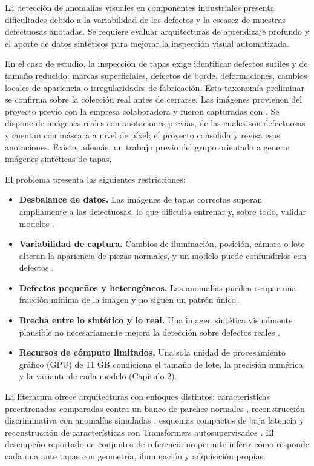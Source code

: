 \documentclass[12pt,oneside]{report}
\begin{document}
La detección de anomalías visuales en componentes industriales presenta dificultades debido a la variabilidad de los defectos y la escasez de muestras defectuosas anotadas. Se requiere evaluar arquitecturas de aprendizaje profundo y el aporte de datos sintéticos para mejorar la inspección visual automatizada.

En el caso de estudio, la inspección de tapas exige identificar defectos sutiles y de tamaño reducido: marcas superficiales, defectos de borde, deformaciones, cambios locales de apariencia o irregularidades de fabricación. Esta taxonomía preliminar se confirma sobre la colección real antes de cerrarse. Las imágenes provienen del proyecto previo con la empresa colaboradora y fueron capturadas con . Se dispone de  imágenes reales con anotaciones previas, de las cuales  son defectuosas y  cuentan con máscara a nivel de píxel; el proyecto consolida y revisa esas anotaciones. Existe, además, un trabajo previo del grupo orientado a generar imágenes sintéticas de tapas.

El problema presenta las siguientes restricciones:

\begin{itemize}
  \item \textbf{Desbalance de datos.} Las imágenes de tapas correctas superan ampliamente a las defectuosas, lo que dificulta entrenar y, sobre todo, validar modelos \cite{pang2021}.
  \item \textbf{Variabilidad de captura.} Cambios de iluminación, posición, cámara o lote alteran la apariencia de piezas normales, y un modelo puede confundirlos con defectos \cite{heckler2026}.
  \item \textbf{Defectos pequeños y heterogéneos.} Las anomalías pueden ocupar una fracción mínima de la imagen y no siguen un patrón único \cite{czimmermann2020}.
  \item \textbf{Brecha entre lo sintético y lo real.} Una imagen sintética visualmente plausible no necesariamente mejora la detección sobre defectos reales \cite{tobin2017}.
  \item \textbf{Recursos de cómputo limitados.} Una sola unidad de procesamiento gráfico (GPU) de 11 GB condiciona el tamaño de lote, la precisión numérica y la variante de cada modelo (Capítulo 2).
\end{itemize}

La literatura ofrece arquitecturas con enfoques distintos: características preentrenadas comparadas contra un banco de parches normales \cite{roth2022}, reconstrucción discriminativa con anomalías simuladas \cite{zavrtanik2021}, esquemas compactos de baja latencia \cite{batzner2024} y reconstrucción de características con Transformers autosupervisados \cite{guo2025}. El desempeño reportado en conjuntos de referencia no permite inferir cómo responde cada una ante tapas con geometría, iluminación y adquisición propias.
\end{document}
